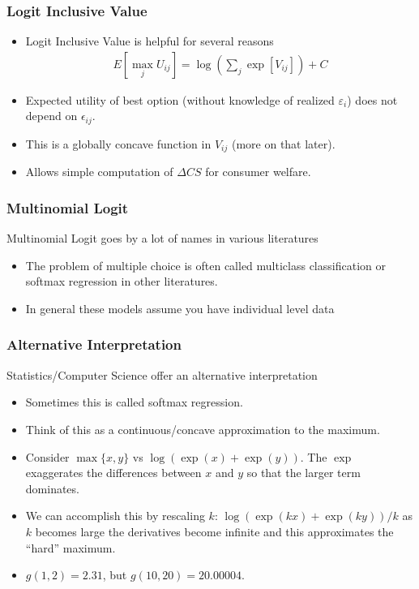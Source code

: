 \documentclass[aspectratio=169,11pt]{beamer}
\begin{document}
\begin{frame}
\frametitle{Logit Inclusive Value}
\begin{itemize}
\item Logit Inclusive Value is helpful for several reasons
\begin{eqnarray*}
E[\max_j U_{ij}] = \log \left(\sum_j \exp[V_{ij}] \right) + C
\end{eqnarray*}
\item Expected utility of best option (without knowledge of realized $\varepsilon_i$) does not depend on $\epsilon_{ij}$.
\item This is a globally concave function in $V_{ij}$ (more on that later).
\item Allows simple computation of $\Delta CS$ for consumer welfare.
\end{itemize}
\end{frame}

\begin{frame}
\frametitle{Multinomial Logit}
Multinomial Logit goes by a lot of names in various literatures
\begin{itemize}
\item The problem of multiple choice is often called \alert{multiclass classification} or \alert{softmax regression} in other literatures.
\item In general these models assume you have individual level data
\end{itemize}
\end{frame}

\begin{frame}
\frametitle{Alternative Interpretation}
Statistics/Computer Science offer an alternative interpretation
\begin{itemize}
\item Sometimes this is called \alert{softmax} regression.
\item Think of this as a continuous/concave approximation to the maximum.
\item Consider $\max\{x,y\}$ vs $\log(\exp(x) + \exp(y))$. The $\exp$ exaggerates the differences between $x$ and $y$ so that the larger term dominates.
\item We can accomplish this by rescaling $k$:  $\log(\exp(kx) + \exp(ky))/k$ as $k$ becomes large the derivatives become infinite and this approximates the ``hard'' maximum.
\item $g(1, 2) = 2.31$, but $g(10, 20) = 20.00004$.
\end{itemize}
\end{frame}
\end{document}
